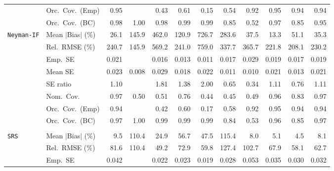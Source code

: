 \begin{landscape}
\begin{longtable}{llrrrrrrrrrr}
 & Orc.\ Cov.\ (Emp) & \cellcolor{rankone}0.95 &  & 0.43 & 0.61 & 0.15 & 0.54 & \cellcolor{rankthree}0.92 & \cellcolor{rankone}0.95 & \cellcolor{ranktwo}0.94 & \cellcolor{ranktwo}0.94 \\
 & Orc.\ Cov.\ (BC) & \cellcolor{rankthree}0.98 & 1.00 & \cellcolor{rankthree}0.98 & 0.99 & 0.99 & 0.85 & 0.52 & \cellcolor{ranktwo}0.97 & 0.85 & \cellcolor{rankone}0.95 \\
\addlinespace[2pt]
\quad \texttt{Neyman-IF} & Mean $|$Bias$|$ (\%) & \cellcolor{ranktwo}26.1 & 145.9 & 462.0 & 120.9 & 726.7 & 283.6 & 37.5 & \cellcolor{rankone}13.3 & 51.1 & \cellcolor{rankthree}35.3 \\
 & Rel.\ RMSE (\%) & 240.7 & \cellcolor{rankone}145.9 & 569.2 & 241.0 & 759.0 & 337.7 & 365.7 & \cellcolor{rankthree}221.8 & \cellcolor{ranktwo}208.1 & 230.2 \\
 & Emp.\ SE & 0.021 &  & 0.016 & 0.013 & 0.011 & 0.017 & 0.029 & 0.019 & 0.017 & 0.019 \\
 & Mean SE & 0.023 & 0.008 & 0.029 & 0.018 & 0.022 & 0.011 & 0.010 & 0.021 & 0.013 & 0.021 \\
 & SE ratio & \cellcolor{rankone}1.10 &  & 1.81 & 1.38 & 2.00 & 0.65 & 0.34 & \cellcolor{ranktwo}1.11 & \cellcolor{rankthree}0.76 & \cellcolor{ranktwo}1.11 \\
 & Nom.\ Cov. & \cellcolor{ranktwo}0.97 & 0.50 & 0.51 & 0.76 & 0.44 & 0.45 & 0.49 & \cellcolor{rankone}0.96 & \cellcolor{rankthree}0.83 & \cellcolor{ranktwo}0.97 \\
 & Orc.\ Cov.\ (Emp) & \cellcolor{ranktwo}0.94 &  & 0.42 & 0.60 & 0.17 & 0.58 & \cellcolor{rankthree}0.92 & \cellcolor{rankone}0.95 & \cellcolor{ranktwo}0.94 & \cellcolor{ranktwo}0.94 \\
 & Orc.\ Cov.\ (BC) & \cellcolor{ranktwo}0.97 & 1.00 & \cellcolor{rankthree}0.99 & \cellcolor{rankthree}0.99 & \cellcolor{rankthree}0.99 & 0.84 & 0.53 & \cellcolor{rankone}0.96 & 0.85 & \cellcolor{ranktwo}0.97 \\
\addlinespace[2pt]
\multicolumn{12}{l}{\textbf{Continuous Phase-One Covariates}} \\
\addlinespace[2pt]
\quad \texttt{SRS} & Mean $|$Bias$|$ (\%) & 9.5 & 110.4 & 24.9 & 56.7 & 47.5 & 115.4 & \cellcolor{rankthree}8.0 & \cellcolor{ranktwo}5.1 & \cellcolor{rankone}4.5 & 8.1 \\
 & Rel.\ RMSE (\%) & 81.6 & 110.4 & \cellcolor{rankone}49.2 & 72.9 & \cellcolor{rankthree}59.8 & 127.4 & 102.7 & 67.9 & \cellcolor{ranktwo}58.1 & 62.7 \\
 & Emp.\ SE & 0.042 &  & 0.022 & 0.023 & 0.019 & 0.028 & 0.053 & 0.035 & 0.030 & 0.032 \\

\end{longtable}
\end{landscape}
